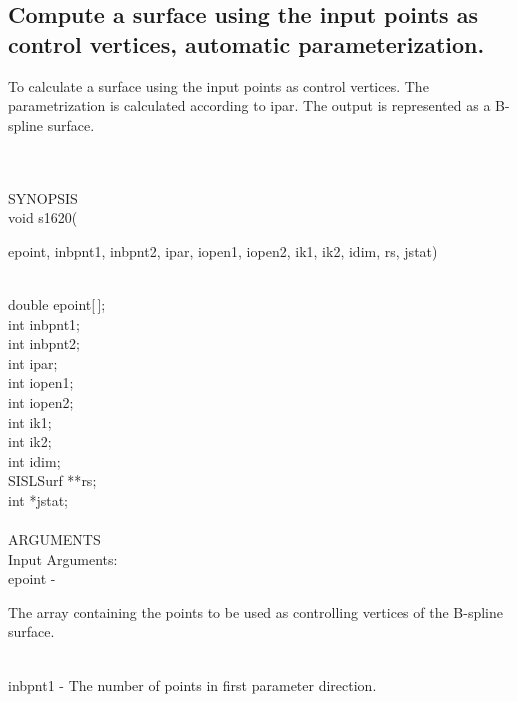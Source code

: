 \subsection{Compute a surface using the input points as
control vertices, automatic parameterization.}
\begin{minipg1}
  To calculate a surface using the input points as
  control vertices. The parametrization is calculated
  according to {\fov ipar}.
  The output is represented as a B-spline surface.
\end{minipg1} \\ \\
SYNOPSIS\\
        \>void s1620(\begin{minipg3}
          {\fov epoint}, {\fov inbpnt1}, {\fov inbpnt2}, {\fov ipar},
          {\fov iopen1}, {\fov iopen2}, {\fov ik1}, {\fov ik2}, {\fov idim}, {\fov rs}, {\fov jstat})
        \end{minipg3}\\[0.3ex]
        \>\>    double \> {\fov epoint}[\,];\\
        \>\>    int    \> {\fov inbpnt1};\\
        \>\>    int    \> {\fov inbpnt2};\\
        \>\>    int    \> {\fov ipar};\\
        \>\>    int    \> {\fov iopen1};\\
        \>\>    int    \> {\fov iopen2};\\
        \>\>    int    \> {\fov ik1};\\
        \>\>    int    \> {\fov ik2};\\
        \>\>    int    \> {\fov idim};\\
        \>\>    SISLSurf \> **{\fov rs};\\
        \>\>    int    \> *{\fov jstat};\\
\\
ARGUMENTS\\
        \>Input Arguments:\\
        \>\>    {\fov epoint} \> - \>
        \begin{minipg2}
          The array containing the points to be used as
          controlling vertices of the B-spline surface.
        \end{minipg2}\\
        \>\>    {\fov inbpnt1} \> - \> The number of points in first
                                       parameter direction.\\
